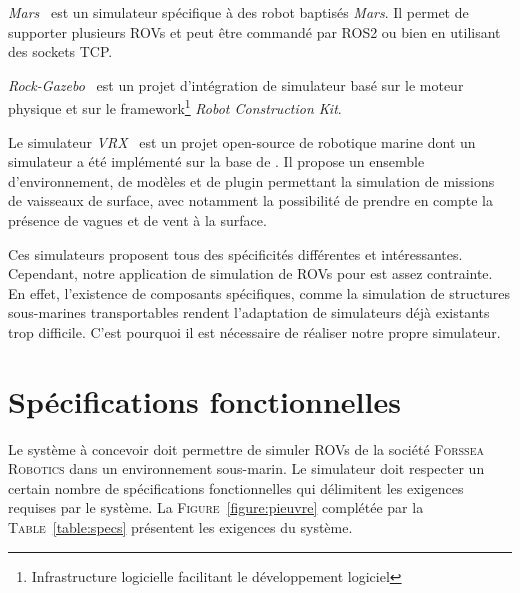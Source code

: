         \textit{Mars}~\cite{MARS} est un simulateur spécifique à des robot baptisés \textit{Mars}. Il permet de supporter plusieurs \gls{ROV}s et peut être commandé par \gls{ROS2} ou bien en utilisant des sockets TCP.
        
        \textit{Rock-Gazebo}~\cite{Rock} est un projet d'intégration de simulateur basé sur le moteur physique \gazebo{} et sur le framework\footnote{Infrastructure logicielle facilitant le développement logiciel} \textit{Robot Construction Kit}.
        
        Le simulateur \textit{VRX}~\cite{bingham19toward} est un projet open-source de robotique marine dont un simulateur a été implémenté sur la base de \gazebo{}. Il propose un ensemble d'environnement, de modèles et de plugin permettant la simulation de missions de vaisseaux de surface, avec notamment la possibilité de prendre en compte la présence de vagues et de vent à la surface.

        Ces simulateurs proposent tous des spécificités différentes et intéressantes. Cependant, notre application de simulation de \gls{ROV}s pour \forssea{} est assez contrainte. En effet, l'existence de composants spécifiques, comme la simulation de structures sous-marines transportables rendent l'adaptation de simulateurs déjà existants trop difficile. C'est pourquoi il est nécessaire de réaliser notre propre simulateur.

    \section{Spécifications fonctionnelles}
        \label{sec:spec_fonc}

        Le système à concevoir doit permettre de simuler \gls{ROV}s de la société \textsc{Forssea Robotics} dans un environnement sous-marin. Le simulateur doit respecter un certain nombre de spécifications fonctionnelles qui délimitent les exigences requises par le système. La \textsc{Figure}~\ref{figure:pieuvre} complétée par la \textsc{Table}~\ref{table:specs} présentent les exigences du système.

